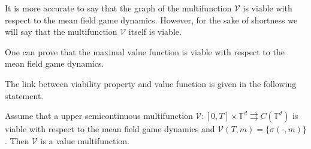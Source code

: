 \documentclass[a4paper,12pt]{article}
\newcommand{\ir}{[0,T]\times\mathbb{T}^d}
\begin{document}
\begin{remark}\label{remark:viability_concept} It is more accurate to say that the graph of the multifunction $\mathcal{V}$ is viable with respect to the mean field game dynamics. However, for the sake of shortness we will say that the multifunction $\mathcal{V}$ itself is viable.
\end{remark}

\begin{remark}\label{remark:max_viability}
	One can prove that the maximal value function is viable with respect to the mean field game dynamics.
\end{remark}

The link between viability property and value function is given in the following statement.

\begin{theorem}\label{th:DPP}
	Assume that a upper semicontinuous multifunction $\mathcal{V}:\ir\rightrightarrows C(\mathbb{T}^d)$  is viable with respect to the mean field game dynamics  and $\mathcal{V}(T,m)=\{\sigma(\cdot,m)\}$. Then $\mathcal{V}$ is a value multifunction.
\end{theorem}

\end{document}
